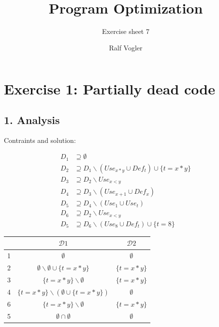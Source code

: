 \documentclass[11pt,a4paper]{scrartcl}
\begin{document}
\author{Ralf Vogler}
\title{Program Optimization}
\subtitle{Exercise sheet 7}

\maketitle

\section*{Exercise 1: Partially dead code}
\subsection*{1. Analysis}
Contraints and solution:\\
\begin{minipage}[T]{0.5\textwidth}
\begin{align*}
D_1 &\supseteq \emptyset \\
D_2 &\supseteq D_1 \backslash (Use_{x*y} \cup Def_t) \cup \{t = x*y\} \\
D_3 &\supseteq D_2 \backslash Use_{x<y} \\
D_4 &\supseteq D_3 \backslash (Use_{x+1} \cup Def_x) \\
D_5 &\supseteq D_4 \backslash (Use_1 \cup Use_t) \\
D_6 &\supseteq D_2 \backslash Use_{x<y} \\
D_5 &\supseteq D_6 \backslash (Use_8 \cup Def_t) \cup \{t = 8\}
\end{align*}
\end{minipage}
\begin{minipage}[t]{0.5\textwidth}
\begin{tabular}{|c|c|c|}
\hline
& $\mathcal{D} 1$ & $\mathcal{D} 2$\\
\hline
1 & $\emptyset$ & $\emptyset$ \\
2 & $\emptyset \backslash \emptyset \cup \{t = x*y\}$ & $\{t = x*y\}$ \\
3 & $\{t = x*y\} \backslash \emptyset$ & $\{t = x*y\}$ \\
4 & $\{t = x*y\} \backslash (\emptyset \cup \{t = x*y\})$ & $\emptyset$ \\
6 & $\{t = x*y\} \backslash \emptyset$ & $\{t = x*y\}$ \\
5 & $\emptyset \cap \emptyset$ & $\emptyset$ \\
\hline
\end{tabular}
\end{minipage}
\\ \\
\end{document}
